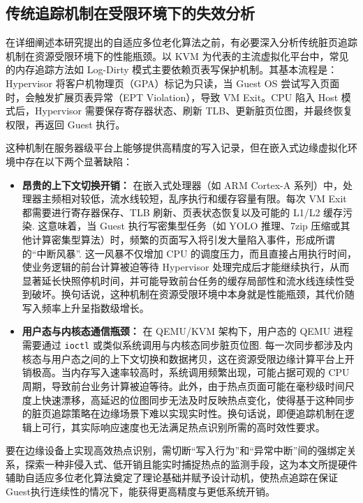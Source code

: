 \subsection{传统追踪机制在受限环境下的失效分析}

在详细阐述本研究提出的自适应多位老化算法之前，有必要深入分析传统脏页追踪机制在资源受限环境下的性能瓶颈。以 KVM 为代表的主流虚拟化平台中，常见的内存追踪方法如 Log-Dirty 模式主要依赖页表写保护机制。其基本流程是：Hypervisor 将客户机物理页（GPA）标记为只读，当 Guest OS 尝试写入页面时，会触发扩展页表异常（EPT Violation），导致 VM Exit。CPU 陷入 Host 模式后，Hypervisor 需要保存寄存器状态、刷新 TLB、更新脏页位图，并最终恢复权限，再返回 Guest 执行。

这种机制在服务器级平台上能够提供高精度的写入记录，但在嵌入式边缘虚拟化环境中存在以下两个显著缺陷：

\begin{itemize}
\item \textbf{昂贵的上下文切换开销：}
在嵌入式处理器（如 ARM Cortex-A 系列）中，处理器主频相对较低，流水线较短，乱序执行和缓存容量有限。每次 VM Exit 都需要进行寄存器保存、TLB 刷新、页表状态恢复以及可能的 L1/L2 缓存污染\cite{xu2015vmexit}. 这意味着，当 Guest 执行写密集型任务（如 YOLO 推理、7zip 压缩或其他计算密集型算法）时，频繁的页面写入将引发大量陷入事件，形成所谓的“中断风暴”\cite{liu2011performance}. 这一风暴不仅增加 CPU 的调度压力，而且直接占用执行时间，使业务逻辑的前台计算被迫等待 Hypervisor 处理完成后才能继续执行，从而显著延长快照停机时间，并可能导致前台任务的缓存局部性和流水线连续性受到破坏。换句话说，这种机制在资源受限环境中本身就是性能瓶颈，其代价随写入频率上升呈指数级增长。

\item \textbf{用户态与内核态通信瓶颈：}
在 QEMU/KVM 架构下，用户态的 QEMU 进程需要通过 \texttt{ioctl} 或类似系统调用与内核态同步脏页位图\cite{zhong2016flic}. 每一次同步都涉及内核态与用户态之间的上下文切换和数据拷贝，这在资源受限边缘计算平台上开销极高。当内存写入速率较高时，系统调用频繁出现，可能占据可观的 CPU 周期，导致前台业务计算被迫等待。此外，由于热点页面可能在毫秒级时间尺度上快速漂移，高延迟的位图同步无法及时反映热点变化，使得基于这种同步的脏页追踪策略在边缘场景下难以实现实时性。换句话说，即便追踪机制在逻辑上可行，其实际响应速度也无法满足热点识别所需的高时效性要求。
\end{itemize}

要在边缘设备上实现高效热点识别，需切断“写入行为”和“异常中断”间的强绑定关系，探索一种非侵入式、低开销且能实时捕捉热点的监测手段，这为本文所提硬件辅助自适应多位老化算法奠定了理论基础并赋予设计动机，使热点追踪在保证Guest执行连续性的情况下，能获得更高精度与更低系统开销。

